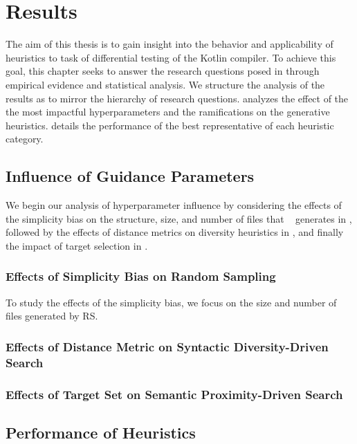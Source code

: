 \chapter{\label{cha:results}Results}

The aim of this thesis is to gain insight into the behavior and applicability
of heuristics to task of differential testing of the Kotlin compiler.
To achieve this goal, this chapter seeks to answer the research questions posed in
 through empirical evidence and statistical analysis.
We structure the analysis of the results as to mirror the hierarchy
of research questions.
 analyzes the effect of the the most impactful
hyperparameters and the ramifications on the generative heuristics.
 details the performance of the best representative
of each heuristic category.

\section{\label{sec:resrq1}Influence of Guidance Parameters}

We begin our analysis of hyperparameter influence by considering the effects of
the simplicity bias on the structure, size, and number of files that \kf~ generates
in , followed by the effects of distance metrics on diversity
heuristics in , and finally the impact 
of target selection in .

\subsection{\label{subsec:simpl_bias}Effects of Simplicity Bias on Random Sampling}

To study the effects of the simplicity bias, we focus on the size and number of files
generated by \gls{RS}.

\subsection{\label{subsec:distance_effect}Effects of Distance Metric on Syntactic Diversity-Driven Search}

\subsection{\label{subsec:targets_effect}Effects of Target Set on Semantic Proximity-Driven Search}


\section{\label{sec:resrq2}Performance of Heuristics}